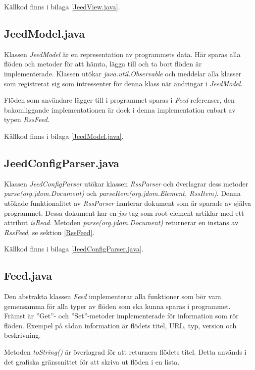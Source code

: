 \documentclass[titlepage, twoside, a4paper, 12pt]{article}
\begin{document}
Källkod finns i bilaga \ref{JeedView.java}.

\subsection{JeedModel.java}\label{JeedModel}
Klassen \textit{JeedModel} är en representation av programmets
data. Här sparas alla flöden och metoder för att hämta, lägga till och
ta bort flöden är implementerade. Klassen utökar
\textit{java.util.Observable} och meddelar alla klasser som
registrerat sig som intressenter för denna klass när ändringar i
\textit{JeedModel}.

Flöden som användare lägger till i programmet sparas i \textit{Feed}
referenser, den bakomliggande implementationen är dock i denna
implementation enbart av typen \textit{RssFeed}.


Källkod finns i bilaga \ref{JeedModel.java}.

\subsection{JeedConfigParser.java}\label{JeedConfigParser}
Klassen \textit{JeedConfigParser} utökar klassen \textit{RssParser}
och överlagrar dess metoder \textit{parse(org.jdom.Document)} och
\textit{parseItem(org.jdom.Element, RssItem)}. Denna utökade
funktionalitet av \textit{RssParser} hanterar dokument som är sparade
av själva programmet. Dessa dokument har en \textit{jss}-tag som root-element
artiklar med ett attribut \textit{isRead}. Metoden
\textit{parse(org.jdom.Document)} returnerar en instans av
\textit{RssFeed}, se sektion \ref{RssFeed}.

Källkod finns i bilaga \ref{JeedConfigParser.java}.

\subsection{Feed.java}\label{Feed}
Den abstrakta klassen \textit{Feed} implementerar alla funktioner som
bör vara gemensamma för alla typer av flöden som ska kunna sparas i
programmet. Främst är ''Get''- och ''Set''-metoder implementerade för
information som rör flöden. Exempel på sådan information är flödets
titel, URL, typ, version och beskrivning.

Metoden \textit{toString()} är överlagrad för att returnera flödets
titel. Detta används i det grafiska gränssnittet för att skriva ut
flöden i en lista.
\end{document}
